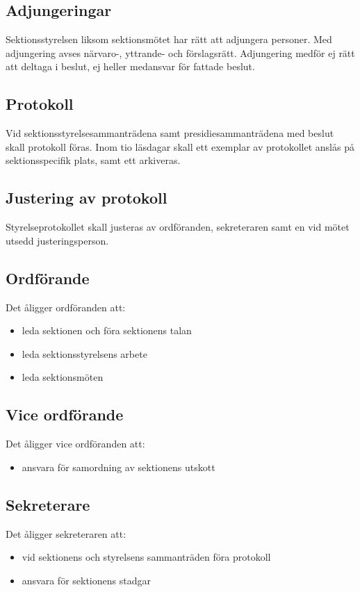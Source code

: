 \documentclass{datateknologsektionen-document}
\begin{document}
\subsection{Adjungeringar}
Sektionsstyrelsen liksom sektionsmötet har rätt att adjungera personer. Med adjungering
avses närvaro-, yttrande- och förslagsrätt. Adjungering medför ej rätt att deltaga i beslut,
ej heller medansvar för fattade beslut.

\subsection{Protokoll}
Vid sektionsstyrelsesammanträdena samt presidiesammanträdena med beslut skall protokoll föras.
Inom tio läsdagar skall ett exemplar av protokollet anslås på sektionsspecifik plats, samt
ett arkiveras.

\subsection{Justering av protokoll}
Styrelseprotokollet skall justeras av ordföranden, sekreteraren samt en vid mötet utsedd
justeringsperson.

\subsection{Ordförande}
Det åligger ordföranden att:
\begin{itemize}
  \item leda sektionen och föra sektionens talan
  \item leda sektionsstyrelsens arbete
  \item leda sektionsmöten
\end{itemize}

\subsection{Vice ordförande}
Det åligger vice ordföranden att:
\begin{itemize}
  \item ansvara för samordning av sektionens utskott
\end{itemize}

\subsection{Sekreterare}
Det åligger sekreteraren att:
\begin{itemize}
  \item vid sektionens och styrelsens sammanträden föra protokoll
  \item ansvara för sektionens stadgar
\end{itemize}
\end{document}
